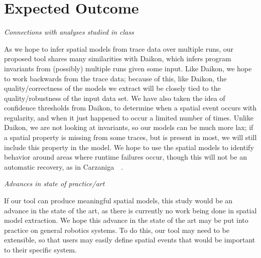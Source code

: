 \section{Expected Outcome} 

\emph{Connections with analyses studied in class}

As we hope to infer spatial models from trace data over multiple runs, our proposed tool shares many similarities with Daikon, which infers program invariants from (possibly) multiple runs given some input.
Like Daikon, we hope to work backwards from the trace data; because of this, like Daikon, the quality/correctness of the models we extract will be closely tied to the quality/robustness of the input data set.
We have also taken the idea of confidence thresholds from Daikon, to determine when a spatial event occurs with regularity, and when it just happened to occur a limited number of times.
Unlike Daikon, we are not looking at invariants, so our models can be much more lax; if a spatial property is missing from some traces, but is present in most, we will still include this property in the model.
We hope to use the spatial models to identify behavior around areas where runtime failures occur, though this will not be an automatic recovery, as in Carzaniga~\etal~\cite{carzaniga2013automatic}.

\emph{Advances in state of practice/art}

If our tool can produce meaningful spatial models, this study would be an advance in the state of the art, as there is currently no work being done in spatial model extraction.
We hope this advance in the state of the art may be put into practice on general robotics systems. 
To do this, our tool may need to be extensible, so that users may easily define spatial events that would be important to their specific system.
